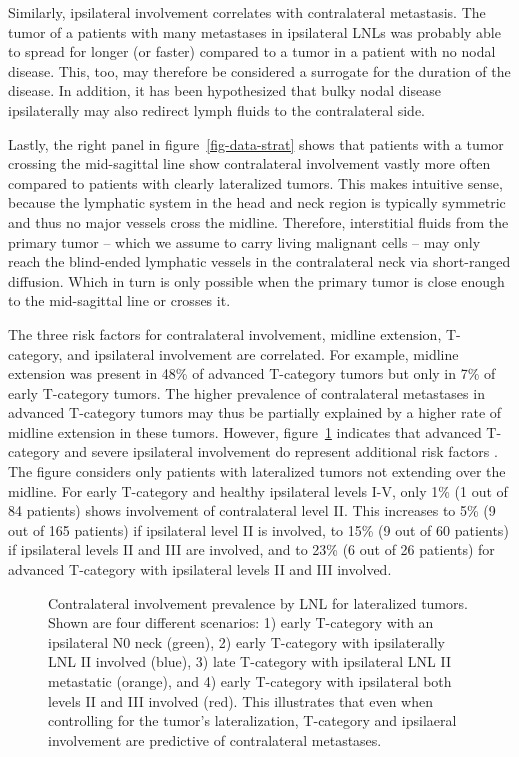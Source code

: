\documentclass[
  sn-mathphys-num,
]{sn-jnl}
\begin{document}
Similarly, ipsilateral involvement correlates with contralateral
metastasis. The tumor of a patients with many metastases in ipsilateral
LNLs was probably able to spread for longer (or faster) compared to a
tumor in a patient with no nodal disease. This, too, may therefore be
considered a surrogate for the duration of the disease. In addition, it
has been hypothesized that bulky nodal disease ipsilaterally may also
redirect lymph fluids to the contralateral side.

Lastly, the right panel in figure~\ref{fig-data-strat} shows that
patients with a tumor crossing the mid-sagittal line show contralateral
involvement vastly more often compared to patients with clearly
lateralized tumors. This makes intuitive sense, because the lymphatic
system in the head and neck region is typically symmetric and thus no
major vessels cross the midline. Therefore, interstitial fluids from the
primary tumor -- which we assume to carry living malignant cells -- may
only reach the blind-ended lymphatic vessels in the contralateral neck
via short-ranged diffusion. Which in turn is only possible when the
primary tumor is close enough to the mid-sagittal line or crosses it.

The three risk factors for contralateral involvement, midline extension,
T-category, and ipsilateral involvement are correlated. For example,
midline extension was present in 48\% of advanced T-category tumors but
only in 7\% of early T-category tumors. The higher prevalence of
contralateral metastases in advanced T-category tumors may thus be
partially explained by a higher rate of midline extension in these
tumors. However, figure~\ref{fig-data-strat-uncorr} indicates that
advanced T-category and severe ipsilateral involvement do represent
additional risk factors . The figure considers only patients with
lateralized tumors not extending over the midline. For early T-category
and healthy ipsilateral levels I-V, only 1\% (1 out of 84 patients)
shows involvement of contralateral level II. This increases to 5\% (9
out of 165 patients) if ipsilateral level II is involved, to 15\% (9 out
of 60 patients) if ipsilateral levels II and III are involved, and to
23\% (6 out of 26 patients) for advanced T-category with ipsilateral
levels II and III involved.

\begin{figure}


\caption{\label{fig-data-strat-uncorr}Contralateral involvement
prevalence by LNL for lateralized tumors. Shown are four different
scenarios: 1) early T-category with an ipsilateral N0 neck (green), 2)
early T-category with ipsilaterally LNL II involved (blue), 3) late
T-category with ipsilateral LNL II metastatic (orange), and 4) early
T-category with ipsilateral both levels II and III involved (red). This
illustrates that even when controlling for the tumor's lateralization,
T-category and ipsilaeral involvement are predictive of contralateral
metastases.}

\end{figure}%
\end{document}
